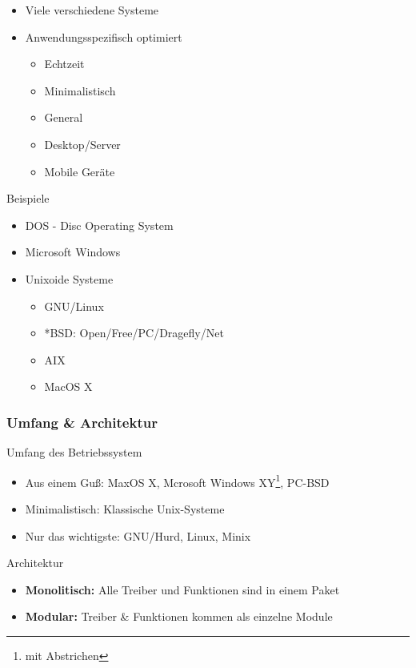 \documentclass[compress]{beamer}
\begin{document}
\begin{frame}
	\begin{block}{}
		\begin{itemize}
			\item Viele verschiedene Systeme 
			\item Anwendungsspezifisch optimiert
				\begin{itemize}
					\item Echtzeit
					\item Minimalistisch
					\item General
					\item Desktop/Server
					\item Mobile Geräte 
				\end{itemize}
		\end{itemize}
	\end{block}
	\begin{block}{Beispiele}
		\begin{itemize}
			\item DOS - Disc Operating System
			\item Microsoft Windows
			\item Unixoide Systeme
				\begin{itemize}
					\item GNU/Linux
					\item *BSD: Open/Free/PC/Dragefly/Net
					\item AIX
					\item MacOS X
				\end{itemize}
		\end{itemize}
	\end{block}
\end{frame}

\begin{frame}
	\frametitle{Umfang \& Architektur}
	\begin{block}{Umfang des Betriebssystem}
		\begin{itemize}
			\item Aus einem Guß: MaxOS X, 
				Mcrosoft Windows XY\footnote{mit Abstrichen}, PC-BSD
			\item Minimalistisch: Klassische Unix-Systeme
			\item Nur das wichtigste: GNU/Hurd, Linux, Minix
		\end{itemize}
	\end{block}
	\pause{}
	\begin{block}{Architektur}
		\begin{itemize}
			\item \textbf{Monolitisch:} Alle Treiber und Funktionen sind 
				in einem Paket
			\item \textbf{Modular:} Treiber \& Funktionen kommen als 
				einzelne Module
		\end{itemize}
	\end{block}
\end{frame}
\end{document}
